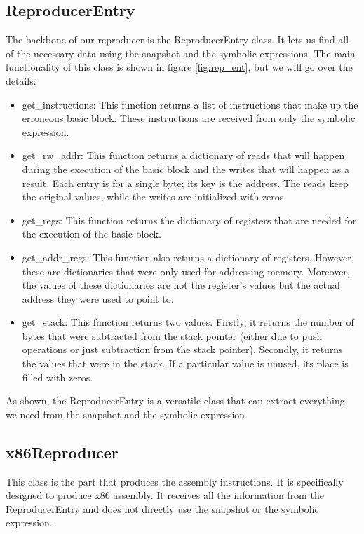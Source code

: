 \subsection{ReproducerEntry}
The backbone of our reproducer is the ReproducerEntry class.
It lets us find all of the necessary data using the snapshot and the symbolic expressions.
The main functionality of this class is shown in figure \ref{fig:rep_ent}, but we will go over the details:

\begin{itemize}
    \item get\_instructions:
    This function returns a list of instructions that make up the erroneous basic block.
    These instructions are received from only the symbolic expression.
    \item get\_rw\_addr:
    This function returns a dictionary of reads that will happen during the execution of the basic block and the writes that will happen as a result.
    Each entry is for a single byte; its key is the address.
    The reads keep the original values, while the writes are initialized with zeros.
    \item get\_regs:
    This function returns the dictionary of registers that are needed for the execution of the basic block.
    \item get\_addr\_regs:
    This function also returns a dictionary of registers.
    However, these are dictionaries that were only used for addressing memory.
    Moreover, the values of these dictionaries are not the register's values but the actual address they were used to point to.
    \item get\_stack:
    This function returns two values.
    Firstly, it returns the number of bytes that were subtracted from the stack pointer (either due to push operations or just subtraction from the stack pointer).
    Secondly, it returns the values that were in the stack.
    If a particular value is unused, its place is filled with zeros.
\end{itemize}

As shown, the ReproducerEntry is a versatile class that can extract everything we need from the snapshot and the symbolic expression.

\subsection{x86Reproducer}
This class is the part that produces the assembly instructions.
It is specifically designed to produce x86 assembly.
It receives all the information from the ReproducerEntry and does not directly use the snapshot or the symbolic expression.

